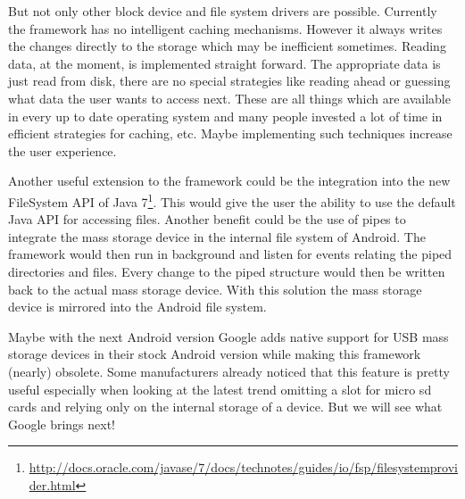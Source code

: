But not only other block device and file system drivers are possible. Currently the framework has no intelligent caching mechanisms. However it always writes the changes directly to the storage which may be inefficient sometimes. Reading data, at the moment, is implemented straight forward. The appropriate data is just read from disk, there are no special strategies like reading ahead or guessing what data the user wants to access next. These are all things which are available in every up to date operating system and many people invested a lot of time in efficient strategies for caching, etc. Maybe implementing such techniques increase the user experience.

Another useful extension to the framework could be the integration into the new FileSystem API of Java 7\footnote{\url{http://docs.oracle.com/javase/7/docs/technotes/guides/io/fsp/filesystemprovider.html}}. This would give the user the ability to use the default Java API for accessing files. Another benefit could be the use of pipes to integrate the mass storage device in the internal file system of Android. The framework would then run in background and listen for events relating the piped directories and files. Every change to the piped structure would then be written back to the actual mass storage device. With this solution the mass storage device is mirrored into the Android file system.

Maybe with the next Android version Google adds native support for USB mass storage devices in their stock Android version while making this framework (nearly) obsolete. Some manufacturers already noticed that this feature is pretty useful especially when looking at the latest trend omitting a slot for micro sd cards and relying only on the internal storage of a device. But we will see what Google brings next!